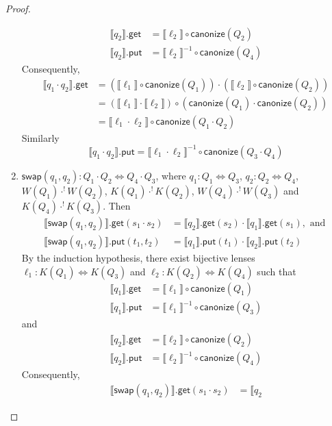\documentclass[acmsmall,review,anonymous]{acmart}
\newcommand{\codefont}[1]{\ensuremath{\mathsf{#1}}}
\newcommand{\kw}[1]{\codefont{#1}}
\newcommand{\canonize}{\ensuremath{\kw{canonize}}}
\newcommand{\get}{\ensuremath{\kw{get}}}
\newcommand{\lput}{\ensuremath{\kw{put}}}
\newcommand{\swap}{\ensuremath{\kw{swap}}}
\begin{document}
\begin{proof}
\begin{enumerate}
\begin{align*}
\llbracket q_2 \rrbracket.\get &= \llbracket \ell_2 \rrbracket \circ
\canonize(Q_2)\\
\llbracket q_2 \rrbracket.\lput &= {\llbracket \ell_2 \rrbracket}^{-1} \circ
\canonize(Q_4)
\end{align*}
Consequently,
\begin{align*}
\llbracket q_1 \cdot q_2 \rrbracket.\get &= (\llbracket \ell_1 \rrbracket \circ
\canonize(Q_1)) \cdot  (\llbracket \ell_2 \rrbracket \circ
\canonize(Q_2))\\
&= (\llbracket \ell_1 \rrbracket \cdot \llbracket \ell_2
\rrbracket) \circ (\canonize(Q_1) \cdot \canonize(Q_2))\\
&= \llbracket \ell_1 \cdot  \ell_2 \rrbracket \circ \canonize(Q_1 \cdot Q_2)
\end{align*}
Similarly
$$
\llbracket q_1 \cdot q_2\rrbracket.\lput = \llbracket \ell_1 \cdot  \ell_2
\rrbracket^{-1} \circ \canonize(Q_3 \cdot Q_4) $$
\item
$\swap(q_1,q_2): Q_1 \cdot Q_2 \Leftrightarrow Q_4 \cdot Q_3$, where $q_1 : Q_1
\Leftrightarrow Q_3 $,  $q_2 : Q_2 \Leftrightarrow Q_4$, $W(Q_1)
\cdot^! W(Q_2)$, $K(Q_1) \cdot^! K(Q_2)$, $W(Q_4) \cdot^! W(Q_3)$ and $
K(Q_4) \cdot^! K(Q_3)$. Then
\begin{align*}
\llbracket \swap(q_1, q_2) \rrbracket.\get(s_1 \cdot s_2) &= \llbracket q_2
\rrbracket.\get(s_2) \cdot \llbracket q_1 \rrbracket.\get(s_1), \text{ and }\\
\llbracket \swap(q_1, q_2) \rrbracket.\lput(t_1, t_2) &= \llbracket q_1
\rrbracket.\lput(t_1) \cdot \llbracket q_2 \rrbracket.\lput(t_2)
\end{align*}
By the induction hypothesis, there exist bijective lenses $\ell_1 : K(Q_1)
\Leftrightarrow K(Q_3)$ and $\ell_2 : K(Q_2) \Leftrightarrow K(Q_4)$ such that
\begin{align*}
\llbracket q_1 \rrbracket.\get &= \llbracket \ell_1 \rrbracket \circ
\canonize(Q_1)\\
\llbracket q_1 \rrbracket.\lput &= {\llbracket \ell_1 \rrbracket}^{-1} \circ
\canonize(Q_3)
\end{align*}
and
\begin{align*}
\llbracket q_2 \rrbracket.\get &= \llbracket \ell_2 \rrbracket \circ
\canonize(Q_2)\\
\llbracket q_2 \rrbracket.\lput &= {\llbracket \ell_2 \rrbracket}^{-1} \circ
\canonize(Q_4)
\end{align*}
Consequently,
\begin{align*}
\llbracket \swap(q_1, q_2) \rrbracket.\get(s_1 \cdot s_2) &= \llbracket q_2

\end{align*}
\end{enumerate}
\end{proof}
\end{document}
